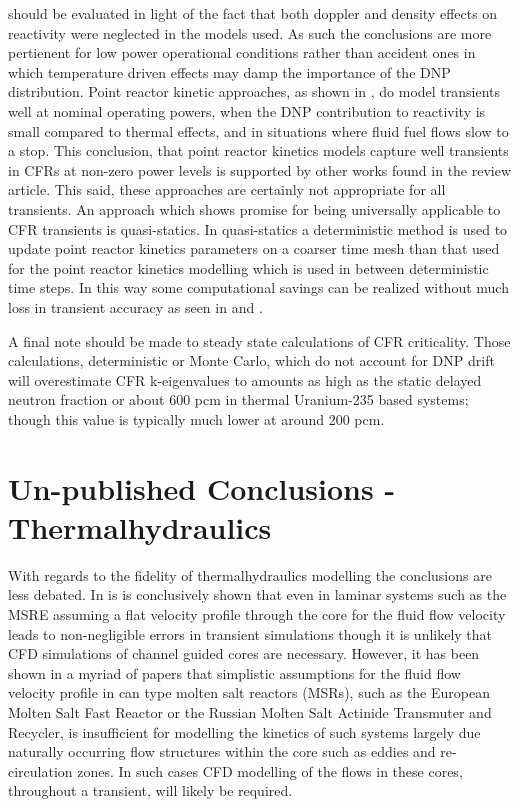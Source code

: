 \documentclass[11pt,letterpaper,twoside,english,final]{article}
\begin{document}
{should be evaluated in light of the fact that both doppler and density effects
on reactivity were neglected in the models used. As such the conclusions are
more pertienent for low power operational conditions rather than accident ones in which
temperature driven effects may damp the importance of the DNP distribution.
 Point reactor kinetic approaches, as
shown in \cite{zhang_comparison_2009}, do model transients well at nominal
operating powers, when the DNP contribution to reactivity is small compared
to thermal effects, and in situations where fluid fuel flows slow to a stop.
This conclusion, that point reactor kinetics models capture well transients in
CFRs at non-zero power levels is supported by other works found in the
review article. This said, these approaches are certainly not appropriate
for all transients. An approach which shows promise for being universally
applicable to CFR transients is quasi-statics. In quasi-statics a deterministic
method is used to update point reactor kinetics parameters on a coarser time
mesh than that used for the point reactor kinetics modelling which is used
in between deterministic time steps. In this way some computational savings
can be realized without much loss in transient accuracy as seen in
\cite{dulla_models_2005} and \cite{rineiski_kinetics_2005}.
\par A final note should be made to steady state calculations of CFR
criticality. Those calculations, deterministic or Monte Carlo, which do not
account for DNP drift will overestimate CFR k-eigenvalues to amounts as high
as the static delayed neutron fraction or about 600 pcm in thermal Uranium-235
based systems; though this value is typically much lower at around 200 pcm.

\section{Un-published Conclusions - Thermalhydraulics}
With regards to the fidelity of thermalhydraulics modelling the conclusions
are less debated. In \cite{dulla_interactions_2007} is is conclusively shown that
even in laminar systems such as the MSRE assuming a flat velocity profile
through the core for the fluid flow velocity leads to non-negligible errors
in transient simulations though it is unlikely that CFD simulations of channel
guided cores are necessary. However, it has been shown in a myriad of papers
that simplistic assumptions for the fluid flow velocity profile in can type
molten salt reactors (MSRs), such as the European Molten Salt Fast Reactor or
the Russian Molten Salt Actinide Transmuter and Recycler, is insufficient for
modelling the kinetics of such systems largely due naturally occurring flow
structures within the core such as eddies and re-circulation zones. In such
cases CFD modelling of the flows in these cores, throughout a transient, will
likely be required.

}
\end{document}
